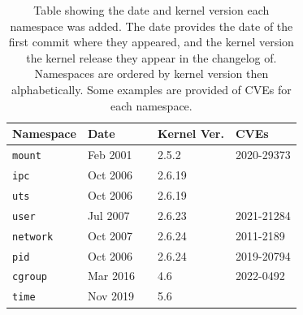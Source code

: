 \documentclass[sigplan]{acmart}
\begin{document}
\begin{table}
    \caption{Table showing the date and kernel version each namespace was added. The date provides the date of the first commit where they appeared, and the kernel version the kernel release they appear in the changelog of. Namespaces are ordered by kernel version then alphabetically. Some examples are provided of CVEs for each namespace.}

    \begin{minipage}{\textwidth}
    \begin{center}
    \begin{tabular}{l|lr|lr|l}
        Namespace & \multicolumn{2}{l}{Date} & \multicolumn{2}{|l|}{Kernel Ver.} & CVEs \\ \hline

        \texttt{mount}
            & Feb 2001 & \citep{viro_patchcft_2001}
            & 2.5.2 & \citep{torvalds_linux_2002}
            & 2020-29373 \\

        \texttt{ipc}
            & Oct 2006 & \citep{korotaev_patch_2006}
            & 2.6.19 & \citep{noauthor_linux_2006}
            & \\

        \texttt{uts}
            & Oct 2006 & \citep{hallyn_patch_2006}
            & 2.6.19 & \citep{noauthor_linux_2006}
            & \\

        \texttt{user}
            & Jul 2007 & \citep{le_goater_user_2007}
            & 2.6.23 & \citep{noauthor_linux_2007}
            & 2021-21284 \\

        \texttt{network}
            & Oct 2007 & \citep{biederman_net_2007}
            & 2.6.24 & \citep{noauthor_linux_2008}
            & 2011-2189 \\

        \texttt{pid}
            & Oct 2006 & \citep{bhattiprolu_patch_2006}
            & 2.6.24 & \citep{noauthor_linux_2008}
            & 2019-20794 \\

        \texttt{cgroup}
            & Mar 2016 & \citep{heo_git_2016}
            & 4.6 & \citep{torvalds_linux_2016}
            & 2022-0492 \\

        \texttt{time}
            & Nov 2019 & \citep{vagin_ns_2020}
            & 5.6 & \citep{noauthor_linux_2020}
            &

    \end{tabular}
    \end{center}
    \end{minipage}
    
    \label{tab:namespaces}
\end{table}
\end{document}
